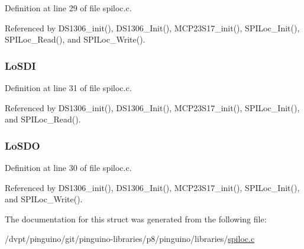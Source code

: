 Definition at line 29 of file spiloc.\-c.



Referenced by D\-S1306\-\_\-init(), D\-S1306\-\_\-\-Init(), M\-C\-P23\-S17\-\_\-init(), S\-P\-I\-Loc\-\_\-\-Init(), S\-P\-I\-Loc\-\_\-\-Read(), and S\-P\-I\-Loc\-\_\-\-Write().

\hypertarget{struct_s_p_i___loc___conf_a77b28d687f22c34e34410af4b2f6fe94}{
\subsubsection[{Lo\-S\-D\-I}]{ Lo\-S\-D\-I}}\label{struct_s_p_i___loc___conf_a77b28d687f22c34e34410af4b2f6fe94}


Definition at line 31 of file spiloc.\-c.



Referenced by D\-S1306\-\_\-init(), D\-S1306\-\_\-\-Init(), M\-C\-P23\-S17\-\_\-init(), S\-P\-I\-Loc\-\_\-\-Init(), and S\-P\-I\-Loc\-\_\-\-Read().

\hypertarget{struct_s_p_i___loc___conf_ae80c6ce5d0950d1d6b0aa4d7b61c7145}{
\subsubsection[{Lo\-S\-D\-O}]{ Lo\-S\-D\-O}}\label{struct_s_p_i___loc___conf_ae80c6ce5d0950d1d6b0aa4d7b61c7145}


Definition at line 30 of file spiloc.\-c.



Referenced by D\-S1306\-\_\-init(), D\-S1306\-\_\-\-Init(), M\-C\-P23\-S17\-\_\-init(), S\-P\-I\-Loc\-\_\-\-Init(), and S\-P\-I\-Loc\-\_\-\-Write().



The documentation for this struct was generated from the following file\-:\begin{DoxyCompactItemize}
\item 
/dvpt/pinguino/git/pinguino-\/libraries/p8/pinguino/libraries/\hyperlink{spiloc_8c}{spiloc.\-c}\end{DoxyCompactItemize}
